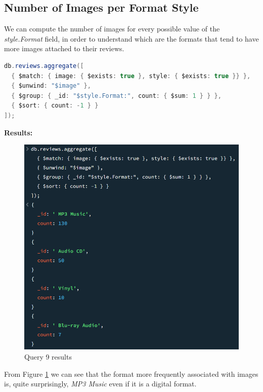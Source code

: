 \subsection{Number of Images per Format Style}
We can compute the number of images for every possible value of the \textit{style.Format} field, in order to understand which are the formats that tend to have more images attached to their reviews. \\
\begin{lstlisting}[language=Java]
db.reviews.aggregate([
  { $match: { image: { $exists: true }, style: { $exists: true }} },
  { $unwind: "$image" },
  { $group: { _id: "$style.Format:", count: { $sum: 1 } } },
  { $sort: { count: -1 } }
]);
\end{lstlisting}
\textbf{Results:}
\begin{figure}[H]
  \centering
  \includegraphics[scale=0.6]{Images/q9_result.png}
  \caption{Query 9 results}
  \label{fig:q9_result}
\end{figure}
From Figure \ref{fig:q9_result} we can see that the format more frequently associated with images is, quite surprisingly, \textit{MP3 Music} even if it is a digital format. \\

\newpage
